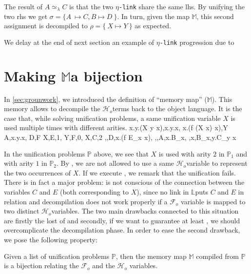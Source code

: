 \documentclass[sigconf,natbib=false,review]{acmart}
\newcommand{\appsep}{\ensuremath{\textcolor{lightgray}{\cdot}}}
\newcommand{\UnifRel}{\ensuremath{\simeq}}
\newcommand{\Ue}{\ensuremath{\UnifRel_\lambda}\xspace}
\newcommand{\linkMacro}[1]{\ensuremath{#1}\texttt{-link}\xspace}
\newcommand{\linketa} {\linkMacro{\eta}}
\newcommand{\Fo}{\texorpdfstring{\ensuremath{\mathcal{F}_{\!o}\xspace}}{Fo}} %
\newcommand{\Ho}{\texorpdfstring{\ensuremath{\mathcal{H}_o}\xspace}{Ho}}
\newcommand{\lhs}{lhs\xspace}
\newcommand{\rhs}{rhs\xspace}
\newcommand{\linkStore}{\texorpdfstring{\ensuremath{\mathbb{L}}\xspace}{L}}
\newcommand{\mapStore}{\texorpdfstring{\ensuremath{\mathbb{M}}\xspace}{M}}
\newcommand{\foUnifPb}{\ensuremath{\mathbb{P}}\xspace}
\begin{document}
\noindent
The result of $A \Ue{} C$ is that the two \linketa share the same \lhs.
By unifying the two \rhs we get
$\sigma = \{ A~ \mapsto C, B \mapsto D ~\}$.
In turn, given the map \mapStore, this second assignment is decompiled to
$\rho = \{~ X \mapsto Y ~\}$ as expected.

We delay at the end of  next section an example of \linketa progression due to
\progressetaright


\section{Making \mapStore a bijection}
\label{sec:invariant1}

In \cref{sec:grounwork}, we introduced the definition of ``memory map'' (\mapStore).
This memory allows to decompile the \Ho terms back to the object language.
It is the case that, while solving unification problems, a same unification
variable $X$ is used multiple times with different arities.
%
\printAlll
  {{{\lambda x.\lambda y.(X\appsep y\appsep x),\lambda x.\lambda y.x},
    {\lambda x.(f\appsep (X\appsep x)\appsep x),Y}}}
  {{{A,\lambda x.\lambda y.x},
    {D,F}}}
  {{{X,E,1},
    {Y,F,0},
    {X,C,2}}}
  {{{\eta,,D,\lambda x.(f\appsep E_{x}\appsep x)},
    {\eta,,A,\lambda x.B_{x}},
    {\eta,x,B_{x},\lambda y.C_{y x}}}}

In the unification problems \foUnifPb above, we see that $X$ is used with arity $2$ in
$\foUnifPb_1$ and with arity $1$ in $\foUnifPb_2$. 
By , we are not allowed to use a same \Ho variable to 
represent the two occurrences of $X$.
If we execute \hrun, we remark that the unification fails.
There is in fact a major problem:
\hstep is not conscious of the connection between the variables $C$ and $E$ (both corresponding to $X$),
since no link in \linkStore puts $C$ and $E$ in relation and decompilation
does not work properly if a \Fo{} variable is mapped to two distinct \Ho variables. 
The two main drawbacks connected to this situation are 
firstly the lost of  and
secondly, if we want to guarantee at least , we should
overcomplicate the decompilation phase. In order to ease the second
drawback, we pose the following property:

\begin{proposition}[\mapStore is a bijection]
  Given a list of unification problems \foUnifPb, then the memory map \mapStore
  compiled from \foUnifPb is a bijection relating the \Fo{} and the \Ho{} 
  variables.
\end{proposition}
\end{document}
